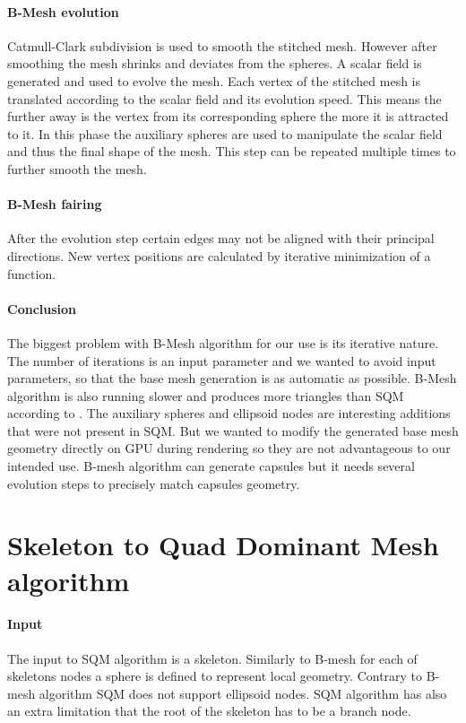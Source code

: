 \paragraph{B-Mesh evolution}
Catmull-Clark subdivision is used to smooth the stitched mesh. However after smoothing the mesh shrinks and deviates from the spheres. A scalar field is generated and used to evolve the mesh. Each vertex of the stitched mesh is translated according to the scalar field and its evolution speed. This means the further away is the vertex from its corresponding sphere the more it is attracted to it. In this phase the auxiliary spheres are used to manipulate the scalar field and thus the final shape of the mesh. This step can be repeated multiple times to further smooth the mesh.

\paragraph{B-Mesh fairing}
After the evolution step certain edges may not be aligned with their principal directions. New vertex positions are calculated by iterative minimization of a function.

\paragraph{Conclusion}
The biggest problem with B-Mesh algorithm for our use is its iterative nature. The number of iterations is an input parameter and we wanted to avoid input parameters, so that the base mesh generation is as automatic as possible. B-Mesh algorithm is also running slower and produces more triangles than SQM according to \cite{sqm}. The auxiliary spheres and ellipsoid nodes are interesting additions that were not present in SQM. But we wanted to modify the generated base mesh geometry directly on GPU during rendering so they are not advantageous to our intended use. B-mesh algorithm can generate capsules but it needs several evolution steps to precisely match capsules geometry.

\section{Skeleton to Quad Dominant Mesh algorithm}
\paragraph{Input}
The input to SQM algorithm is a skeleton. Similarly to B-mesh for each of skeletons nodes a sphere is defined to represent local geometry. Contrary to B-mesh algorithm SQM does not support ellipsoid nodes. SQM algorithm has also an extra limitation that the root of the skeleton has to be a branch node.
